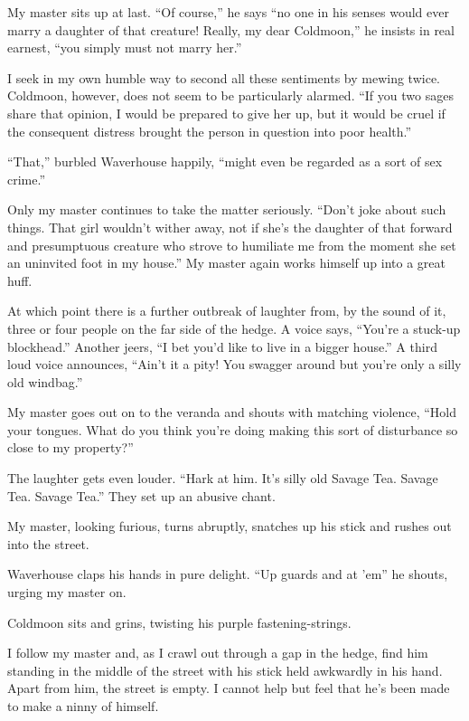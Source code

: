 \documentclass{book}
\begin{document}
My master sits up at last. ``Of course,'' he says ``no one in his senses
would ever marry a daughter of that creature! Really, my dear
Coldmoon,'' he insists in real earnest, ``you simply must not marry
her.''

I seek in my own humble way to second all these sentiments by mewing
twice. Coldmoon, however, does not seem to be particularly alarmed. ``If
you two sages share that opinion, I would be prepared to give her up,
but it would be cruel if the consequent distress brought the person in
question into poor health.''

``That,'' burbled Waverhouse happily, ``might even be regarded as a sort
of sex crime.''

Only my master continues to take the matter seriously. ``Don't joke
about such things. That girl wouldn't wither away, not if she's the
daughter of that forward and presumptuous creature who strove to
humiliate me from the moment she set an uninvited foot in my house.'' My
master again works himself up into a great huff.

At which point there is a further outbreak of laughter from, by the
sound of it, three or four people on the far side of the hedge. A voice
says, ``You're a stuck-up blockhead.'' Another jeers, ``I bet you'd like
to live in a bigger house.'' A third loud voice announces, ``Ain't it a
pity! You swagger around but you're only a silly old windbag.''

My master goes out on to the veranda and shouts with matching violence,
``Hold your tongues. What do you think you're doing making this sort of
disturbance so close to my property?''

The laughter gets even louder. ``Hark at him. It's silly old Savage Tea.
Savage Tea. Savage Tea.'' They set up an abusive chant.

My master, looking furious, turns abruptly, snatches up his stick and
rushes out into the street.

Waverhouse claps his hands in pure delight. ``Up guards and at 'em'' he
shouts, urging my master on.

Coldmoon sits and grins, twisting his purple fastening-strings.

I follow my master and, as I crawl out through a gap in the hedge, find
him standing in the middle of the street with his stick held awkwardly
in his hand. Apart from him, the street is empty. I cannot help but feel
that he's been made to make a ninny of himself.
\end{document}
